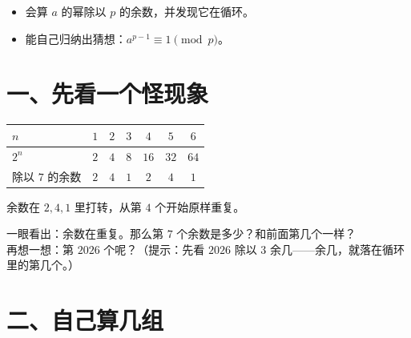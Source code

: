 


\begin{mubiao}
  \begin{itemize}
    \item 会算 \(a\) 的幂除以 \(p\) 的余数，并发现它在循环。
    \item 能自己归纳出猜想：\(a^{p-1}\equiv1\pmod p\)。
  \end{itemize}
\end{mubiao}

\section*{一、先看一个怪现象}

\begin{example}[\(2\) 的幂除以 \(7\)]
  \begin{center}
  \begin{tabular}{@{}lcccccc@{}}
    \toprule
    \(n\) & \(1\) & \(2\) & \(3\) & \(4\) & \(5\) & \(6\) \\
    \midrule
    \(2^n\) & \(2\) & \(4\) & \(8\) & \(16\) & \(32\) & \(64\) \\
    除以 \(7\) 的余数 & \(2\) & \(4\) & \(1\) & \(2\) & \(4\) & \(1\) \\
    \bottomrule
  \end{tabular}
  \end{center}
  余数在 \(2,4,1\) 里打转，从第 \(4\) 个开始原样重复。
\end{example}

\begin{sikao}
  一眼看出：余数在重复。那么第 \(7\) 个余数是多少？和前面第几个一样？\\
  再想一想：第 \(2026\) 个呢？（提示：先看 \(2026\) 除以 \(3\) 余几——余几，就落在循环里的第几个。）
\end{sikao}

\section*{二、自己算几组}

